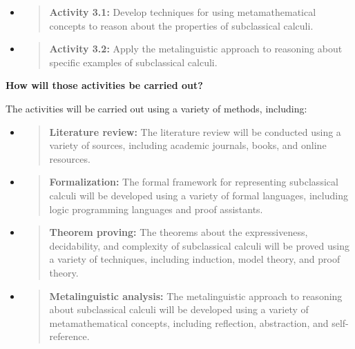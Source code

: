 \begin{itemize}
  \begin{itemize}
  \item
    \begin{quote}
    \textbf{Activity 3.1:} Develop techniques for using metamathematical
    concepts to reason about the properties of subclassical calculi.
    \end{quote}
  \item
    \begin{quote}
    \textbf{Activity 3.2:} Apply the metalinguistic approach to
    reasoning about specific examples of subclassical calculi.
    \end{quote}
  \end{itemize}
\end{itemize}

\textbf{How will those activities be carried out?}

The activities will be carried out using a variety of methods,
including:

\begin{itemize}
\item
  \begin{quote}
  \textbf{Literature review:} The literature review will be conducted
  using a variety of sources, including academic journals, books, and
  online resources.
  \end{quote}
\item
  \begin{quote}
  \textbf{Formalization:} The formal framework for representing
  subclassical calculi will be developed using a variety of formal
  languages, including logic programming languages and proof assistants.
  \end{quote}
\item
  \begin{quote}
  \textbf{Theorem proving:} The theorems about the expressiveness,
  decidability, and complexity of subclassical calculi will be proved
  using a variety of techniques, including induction, model theory, and
  proof theory.
  \end{quote}
\item
  \begin{quote}
  \textbf{Metalinguistic analysis:} The metalinguistic approach to
  reasoning about subclassical calculi will be developed using a variety
  of metamathematical concepts, including reflection, abstraction, and
  self-reference.
  \end{quote}
\end{itemize}

